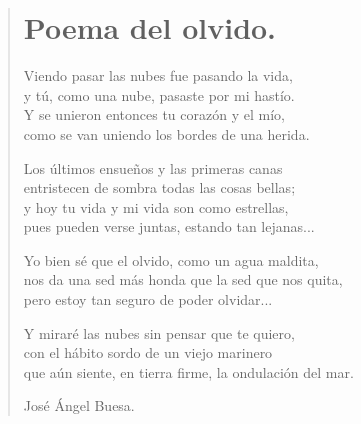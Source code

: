 \documentclass[11pt, portrait, twoside, notitlepage, openright]{book}
\begin{document}
\newpage
\begin{verse}
\begin{center}
\section{Poema del olvido.}
\end{center}
Viendo pasar las nubes fue pasando la vida,\\
y tú, como una nube, pasaste por mi hastío.\\
Y se unieron entonces tu corazón y el mío,\\
como se van uniendo los bordes de una herida.
\newline

Los últimos ensueños y las primeras canas\\
entristecen de sombra todas las cosas bellas;\\
y hoy tu vida y mi vida son como estrellas,\\
pues pueden verse juntas, estando tan lejanas...
\newline

Yo bien sé que el olvido, como un agua maldita,\\
nos da una sed más honda que la sed que nos quita,\\
pero estoy tan seguro de poder olvidar...
\newline

Y miraré las nubes sin pensar que te quiero,\\
con el hábito sordo de un viejo marinero\\
que aún siente, en tierra firme, la ondulación del mar.
\newline

José Ángel Buesa.
\end{verse}
\end{document}
